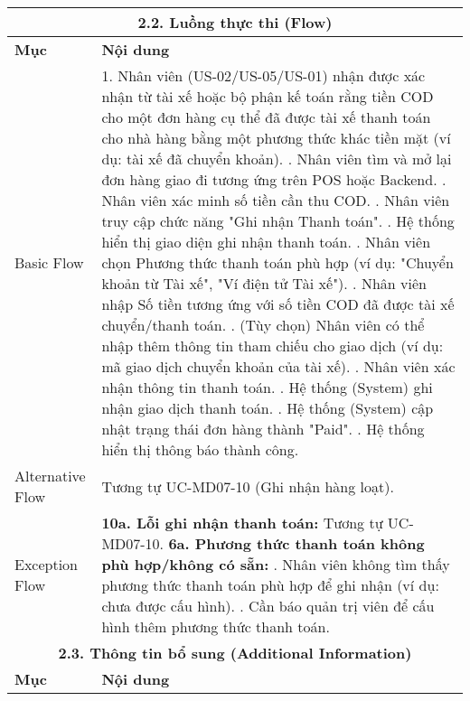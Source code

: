 \begin{longtable}{|m{4cm}|p{11cm}|}
\hline
\multicolumn{2}{|c|}{\textbf{2.2. Luồng thực thi (Flow)}} \\
\hline
\textbf{Mục} & \textbf{Nội dung} \\
\hline
Basic Flow & 1. Nhân viên (US-02/US-05/US-01) nhận được xác nhận từ tài xế hoặc bộ phận kế toán rằng tiền COD cho một đơn hàng cụ thể đã được tài xế thanh toán cho nhà hàng bằng một phương thức khác tiền mặt (ví dụ: tài xế đã chuyển khoản). \newline 2. Nhân viên tìm và mở lại đơn hàng giao đi tương ứng trên POS hoặc Backend. \newline 3. Nhân viên xác minh số tiền cần thu COD. \newline 4. Nhân viên truy cập chức năng "Ghi nhận Thanh toán". \newline 5. Hệ thống hiển thị giao diện ghi nhận thanh toán. \newline 6. Nhân viên chọn Phương thức thanh toán phù hợp (ví dụ: "Chuyển khoản từ Tài xế", "Ví điện tử Tài xế"). \newline 7. Nhân viên nhập Số tiền tương ứng với số tiền COD đã được tài xế chuyển/thanh toán. \newline 8. (Tùy chọn) Nhân viên có thể nhập thêm thông tin tham chiếu cho giao dịch (ví dụ: mã giao dịch chuyển khoản của tài xế). \newline 9. Nhân viên xác nhận thông tin thanh toán. \newline 10. Hệ thống (System) ghi nhận giao dịch thanh toán. \newline 11. Hệ thống (System) cập nhật trạng thái đơn hàng thành "Paid". \newline 12. Hệ thống hiển thị thông báo thành công. \\
\hline
Alternative Flow & Tương tự UC-MD07-10 (Ghi nhận hàng loạt). \\
\hline
Exception Flow & \textbf{10a. Lỗi ghi nhận thanh toán:} Tương tự UC-MD07-10. \newline \textbf{6a. Phương thức thanh toán không phù hợp/không có sẵn:} \newline    1. Nhân viên không tìm thấy phương thức thanh toán phù hợp để ghi nhận (ví dụ: chưa được cấu hình). \newline    2. Cần báo quản trị viên để cấu hình thêm phương thức thanh toán. \\
\hline
\multicolumn{2}{|c|}{\textbf{2.3. Thông tin bổ sung (Additional Information)}} \\
\hline
\textbf{Mục} & \textbf{Nội dung} \\

\end{longtable}
